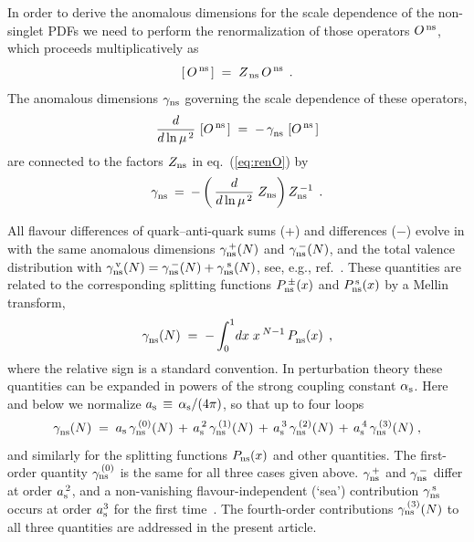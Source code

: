 \documentclass[12pt]{article}
\newcommand{\beq}{\begin{equation}}
\newcommand{\eeq}{\end{equation}}
\newcommand{\als}{\alpha_{\rm s}}
\newcommand{\ars}{a_{\rm s}}
\def\mus{{\mu^{\,2}}}
\begin{document}
In order to derive the anomalous dimensions for the scale dependence of the 
non-singlet PDFs we need to perform the renormalization of those operators 
$O^{\,\rm ns}$, which proceeds multiplicatively as 
%
\beq
\label{eq:renO}
  \left[\,O^{\,\rm ns\,}\right] \;=\;  Z_{\,\rm ns}\, O^{\,\rm ns}
\:\: .
\eeq
%
The anomalous dimensions $\gamma_{\rm ns}$ governing the scale dependence
of these operators,
%
\beq
\label{eq:gamma}
  \frac{d}{d \ln \mus }\, \left[O^{\,\rm ns\,}\right]  \;=\; 
  - \,\gamma_{\rm ns}^{}\, \left[O^{\,\rm ns\,}\right] 
\eeq
%
are connected to the factors $Z_{\rm ns}$ in eq.~(\ref{eq:renO}) by
%
\beq
\label{eq:gamZ}
 \gamma_{\rm ns}^{} \: = \: 
 -\,\bigg( \,\frac{d }{d\ln\mus }\; Z_{\rm ns} \bigg)\, Z^{\,-1}_{\rm ns} 
\:\: .
\eeq

All flavour differences of quark--anti-quark sums (+) and differences ($-$)
evolve in with the same anomalous dimensions $\gamma_{\rm ns}^{\,+}(N)$ 
and $\gamma_{\rm ns}^{\,-}(N)$, and the total valence distribution with
$  \gamma_{\rm ns}^{\,\rm v}(N) 
 = \gamma_{\rm ns}^{\,-}(N) + \gamma_{\rm ns}^{\;\rm s}(N) $, 
see, e.g., ref.~\cite{Moch:2004pa}.
These quantities are related to the corresponding splitting functions 
$P_{\rm ns}^{\,\pm}(x)$ and $P_{\rm ns}^{\,\rm s}(x) $ by a Mellin transform, 
%
\beq
\label{eq:Mtrf}
  \gamma_{\rm ns}^{}(N) \;=\; - \int_0^1 \!dx\; x^{\:N-1}\, P_{\rm ns}^{}(x)
\:\: ,
\eeq
%
where the relative sign is a standard convention.
In perturbation theory these quantities can be expanded in powers of the 
strong coupling constant $\als$.  
Here and below we normalize $\ars\,\equiv\, \als /(4\pi)$, so that up to four 
loops 
%
\beq
\label{eq:asexp}
  \gamma_{\rm ns}^{}(N) \; =\; 
        \ars\,       \gamma_{\rm ns}^{\,(0)}(N) 
  \,+\, \ars^{\,2}\, \gamma_{\rm ns}^{\,(1)}(N) 
  \,+\, \ars^{\,3}\, \gamma_{\rm ns}^{\,(2)}(N) 
  \,+\, \ars^{\,4}\, \gamma_{\rm ns}^{\,(3)}(N) 
\; ,
\eeq
%
and similarly for the splitting functions $P_{\rm ns}(x)$ and other quantities.
The first-order quantity $\gamma_{\rm ns}^{\,(0)}$ is the same for all three 
cases given above. 
$\gamma_{\rm ns}^{\,+}$ and $\gamma_{\rm ns}^{\,-}$ differ at order 
$\ars^{\,2}$, and  a non-vanishing flavour-independent (`sea') contribution 
$\gamma_{\rm ns}^{\,\rm s}$ occurs at order $\ars^3$ for the first 
time~\cite{Moch:2004pa}. 
The fourth-order contributions $\gamma_{\rm ns}^{\,(3)}(N)$ to all three 
quantities are addressed in the present article.
\end{document}

